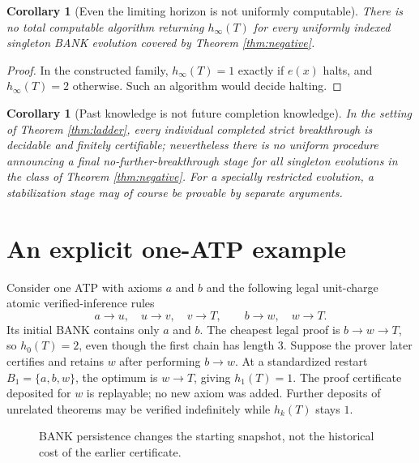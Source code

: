 \documentclass[11pt]{article}
\newtheorem{corollary}[theorem]{Corollary}
\theoremstyle{definition}
\begin{document}
\begin{corollary}[Even the limiting horizon is not uniformly computable]
There is no total computable algorithm returning $h_\infty(T)$ for every uniformly indexed singleton BANK evolution covered by Theorem \ref{thm:negative}.
\end{corollary}
\begin{proof}
In the constructed family, $h_\infty(T)=1$ exactly if $e(x)$ halts, and $h_\infty(T)=2$ otherwise. Such an algorithm would decide halting.
\end{proof}

\begin{corollary}[Past knowledge is not future completion knowledge]
In the setting of Theorem \ref{thm:ladder}, every individual completed strict breakthrough is decidable and finitely certifiable; nevertheless there is no \emph{uniform} procedure announcing a final no-further-breakthrough stage for all singleton evolutions in the class of Theorem \ref{thm:negative}. For a specially restricted evolution, a stabilization stage may of course be provable by separate arguments.
\end{corollary}

\section{An explicit one-ATP example}\label{sec:example}
Consider one ATP with axioms $a$ and $b$ and the following legal unit-charge atomic verified-inference rules
\[
a\longrightarrow u,\quad u\longrightarrow v,\quad v\longrightarrow T,
\qquad b\longrightarrow w,\quad w\longrightarrow T.
\]
Its initial BANK contains only $a$ and $b$. The cheapest legal proof is $b\to w\to T$, so $h_0(T)=2$, even though the first chain has length $3$. Suppose the prover later certifies and retains $w$ after performing $b\to w$. At a standardized restart $B_1=\{a,b,w\}$, the optimum is $w\to T$, giving $h_1(T)=1$. The proof certificate deposited for $w$ is replayable; no new axiom was added. Further deposits of unrelated theorems may be verified indefinitely while $h_k(T)$ stays $1$.

\begin{figure}[ht]
\centering
{}
\caption{BANK persistence changes the starting snapshot, not the historical cost of the earlier certificate.}
\end{figure}
\end{document}
